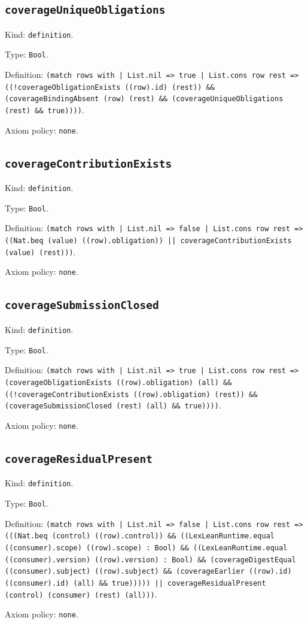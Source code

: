 \documentclass[11pt]{article}
\begin{document}
\subsection*{\texttt{coverageUniqueObligations}}
\noindent Kind: \texttt{definition}.\par
\noindent Type: \texttt{Bool}.\par
\noindent Definition: \texttt{(match rows with | List.nil => true | List.cons row rest => ((!coverageObligationExists ((row).id) (rest)) \&\& (coverageBindingAbsent (row) (rest) \&\& (coverageUniqueObligations (rest) \&\& true))))}.\par
\noindent Axiom policy: \texttt{none}.\par
\subsection*{\texttt{coverageContributionExists}}
\noindent Kind: \texttt{definition}.\par
\noindent Type: \texttt{Bool}.\par
\noindent Definition: \texttt{(match rows with | List.nil => false | List.cons row rest => ((Nat.beq (value) ((row).obligation)) || coverageContributionExists (value) (rest)))}.\par
\noindent Axiom policy: \texttt{none}.\par
\subsection*{\texttt{coverageSubmissionClosed}}
\noindent Kind: \texttt{definition}.\par
\noindent Type: \texttt{Bool}.\par
\noindent Definition: \texttt{(match rows with | List.nil => true | List.cons row rest => (coverageObligationExists ((row).obligation) (all) \&\& ((!coverageContributionExists ((row).obligation) (rest)) \&\& (coverageSubmissionClosed (rest) (all) \&\& true))))}.\par
\noindent Axiom policy: \texttt{none}.\par
\subsection*{\texttt{coverageResidualPresent}}
\noindent Kind: \texttt{definition}.\par
\noindent Type: \texttt{Bool}.\par
\noindent Definition: \texttt{(match rows with | List.nil => false | List.cons row rest => (((Nat.beq (control) ((row).control)) \&\& ((LexLeanRuntime.equal ((consumer).scope) ((row).scope) : Bool) \&\& ((LexLeanRuntime.equal ((consumer).version) ((row).version) : Bool) \&\& (coverageDigestEqual ((consumer).subject) ((row).subject) \&\& (coverageEarlier ((row).id) ((consumer).id) (all) \&\& true))))) || coverageResidualPresent (control) (consumer) (rest) (all)))}.\par
\noindent Axiom policy: \texttt{none}.\par
\end{document}
